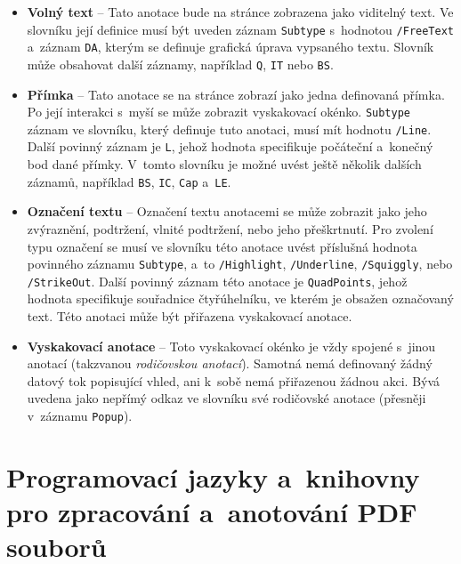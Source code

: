 \begin{itemize}
    \item \textbf{Volný text} -- Tato anotace bude na stránce
    zobrazena jako viditelný text. Ve slovníku její definice
    musí být uveden záznam \texttt{Subtype} s~hodnotou
    \texttt{/FreeText} a~záznam \texttt{DA}, kterým se definuje
    grafická úprava vypsaného textu. Slovník může obsahovat další
    záznamy, například \texttt{Q}, \texttt{IT} nebo \texttt{BS}.
    
    \item \textbf{Přímka} -- Tato anotace se na stránce zobrazí
    jako jedna definovaná přímka. Po její interakci s~myší se
    může zobrazit vyskakovací okénko. \texttt{Subtype} záznam ve slovníku, který
    definuje tuto anotaci, musí mít hodnotu \texttt{/Line}. Další
    povinný záznam je \texttt{L}, jehož hodnota specifikuje počáteční 
    a~konečný bod dané přímky. V~tomto slovníku je možné uvést
    ještě několik dalších záznamů, například \texttt{BS}, \texttt{IC},
    \texttt{Cap} a~\texttt{LE}.
    
    \item \textbf{Označení textu} -- Označení textu anotacemi se může zobrazit
    jako jeho zvýraznění, podtržení, vlnité podtržení, nebo jeho přeškrtnutí.
    Pro zvolení typu označení se musí ve slovníku této anotace uvést příslušná
    hodnota povinného záznamu \texttt{Subtype}, a~to \texttt{/Highlight},
    \texttt{/Underline}, \texttt{/Squiggly}, nebo \texttt{/StrikeOut}.
    Další povinný záznam této anotace je \texttt{QuadPoints}, jehož hodnota
    specifikuje souřadnice čtyřúhelníku, ve kterém je obsažen označovaný text.
    Této anotaci může být přiřazena vyskakovací anotace.
    
    \item \textbf{Vyskakovací anotace} -- Toto vyskakovací okénko je vždy spojené
    s~jinou anotací (takzvanou \emph{rodičovskou anotací}). Samotná nemá
    definovaný žádný datový tok popisující vhled, ani k~sobě nemá přiřazenou
    žádnou akci. Bývá uvedena jako nepřímý odkaz ve slovníku své rodičovské
    anotace (přesněji v~záznamu \texttt{Popup}).
\end{itemize}



\section{Programovací jazyky a~knihovny pro zpracování a~anotování PDF souborů}


